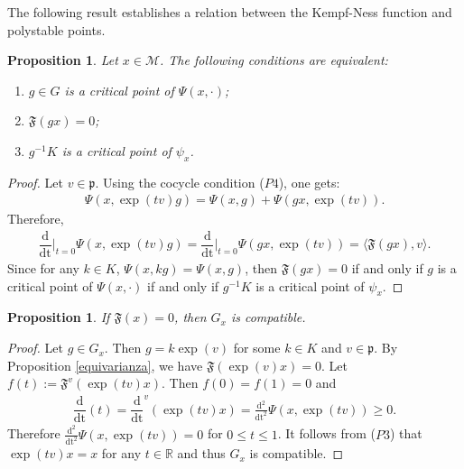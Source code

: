 \documentclass[leqno,11pt, a4]{amsart}
\newtheorem{prop}[equation]{Proposition}
\theoremstyle{named}
\begin{document}
The following result establishes a relation between the Kempf-Ness function and polystable points.
\begin{prop}\label{critical-point}
  Let $x\in {\mathscr{M}}$. The following conditions are equivalent:
  \begin{enumerate}
  \item $g\in G$ is a critical point of $\Psi(x, {\cdot})$;
  \item ${\mathfrak{F}}(gx) =0$;
  \item $g{^{-1}} K$ is a critical point of $\psi_x$.
  \end{enumerate}
\end{prop}
\begin{proof}
  Let ${{v}} \in {\mathfrak{p}}$. Using the cocycle condition ($P4$), one gets:
  \begin{gather*}
    \Psi(x, \exp(t{{v}} )g ) = \Psi (x,g)+ \Psi (gx,\exp(t{{v}} ) ).
  \end{gather*}
  Therefore,
  \begin{gather}
    \label{derivata-ovunque}
    {{\dfrac {\mathrm {d}  }{\mathrm {dt}}} \vert _{t=0} } \Psi(x, \exp(t{{v}} ) g) = {{\dfrac {\mathrm {d}  }{\mathrm {dt}}} \vert _{t=0} } \Psi(gx, \exp(t{{v}} )) = {\langle}
    {\mathfrak{F}} (gx), {{v}} {\rangle}.
  \end{gather}
  Since for any $k\in K$, $\Psi(x,kg)=\Psi(x,g)$, then ${\mathfrak{F}} (gx)=0$
  if and only if $g$ is a critical point of $\Psi (x,\cdot)$ if and
  only if $g{^{-1}} K$ is a critical point of $\psi_x$.
\end{proof}
\begin{prop}\label{compatible}
   If ${\mathfrak{F}} (x)=0$, then $G_x$ is compatible.
 \end{prop}
 \begin{proof}
   Let $g\in G_x$. Then $g=k \exp ({{v}})$ for some $k\in K$ and
   ${{v}}\in {\mathfrak{p}}$. By Proposition \ref{equivarianza}, we have
   ${\mathfrak{F}} (\exp ({{v}}) x)=0$. Let $f(t):={\mathfrak{F}}^{{v}} (\exp (t{{v}})x)$. Then
   $f(0)=f(1)=0$ and
   \begin{gather*}
     {\dfrac {\mathrm {d}  }{\mathrm {dt}}}(t)={\dfrac {\mathrm {d}  }{\mathrm {dt}}}^{{v}} (\exp
     (t{{v}})x)=\frac{\mathrm{d^2}}{\mathrm{dt}^2 } \Psi(x,\exp(t{{v}}))
     \geq 0.
   \end{gather*}
   Therefore
   $\frac{\mathrm{d^2}}{\mathrm{dt}^2 } \Psi(x,\exp(t{{v}}))=0$ for
   $0\leq t \leq 1$.  It follows from ($P3$) that $\exp(t {{v}})x=x$ for any $t\in {\mathbb{R}}$ and thus
   $G_x$ is compatible.
 \end{proof}
\end{document}
